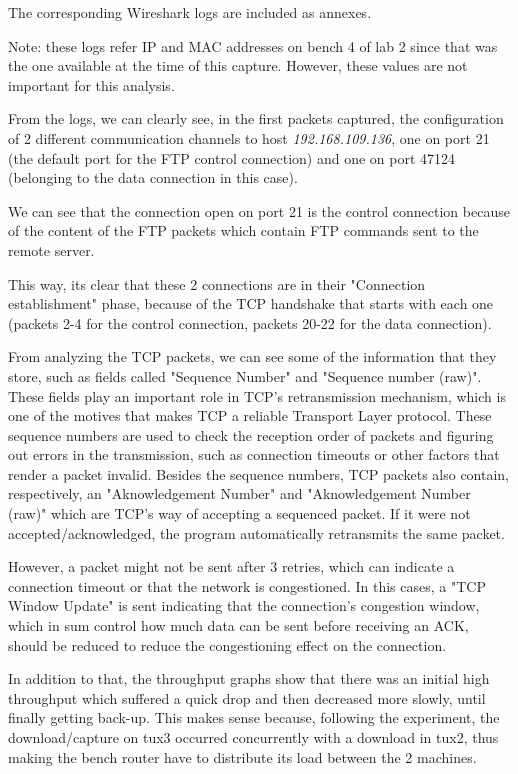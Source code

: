 \documentclass[11pt,a4paper,twocolumn]{article}
\begin{document}
The corresponding Wireshark logs are included as annexes.

Note: these logs refer IP and MAC addresses on bench 4 of lab 2 since that was the one available at the time of this capture. However, these values are not important for this analysis.

From the logs, we can clearly see, in the first packets captured, the configuration of 2 different communication channels to host \textit{192.168.109.136}, one on port 21 (the default port for the FTP control connection) and one on port 47124 (belonging to the data connection in this case).

We can see that the connection open on port 21 is the control connection because of the content of the FTP packets which contain FTP commands sent to the remote server.

This way, its clear that these 2 connections are in their "Connection establishment" phase, because of the TCP handshake that starts with each one (packets 2-4 for the control connection, packets 20-22 for the data connection).

From analyzing the TCP packets, we can see some of the information that they store, such as fields called "Sequence Number" and "Sequence number (raw)". These fields play an important role in TCP's retransmission mechanism, which is one of the motives that makes TCP a reliable Transport Layer protocol. These sequence numbers are used to check the reception order of packets and figuring out errors in the transmission, such as connection timeouts or other factors that render a packet invalid. Besides the sequence numbers, TCP packets also contain, respectively, an "Aknowledgement Number" and "Aknowledgement Number (raw)" which are TCP's way of accepting a sequenced packet. If it were not accepted/acknowledged, the program automatically retransmits the same packet.

However, a packet might not be sent after 3 retries, which can indicate a connection timeout or that the network is congestioned. In this cases, a "TCP Window Update" is sent indicating that the connection's congestion window, which in sum control how much data can be sent before receiving an ACK, should be reduced to reduce the congestioning effect on the connection.

In addition to that, the throughput graphs show that there was an initial high throughput which suffered a quick drop and then decreased more slowly, until finally getting back-up. This makes sense because, following the experiment, the download/capture on tux3 occurred concurrently with a download in tux2, thus making the bench router have to distribute its load between the 2 machines. 
\end{document}
